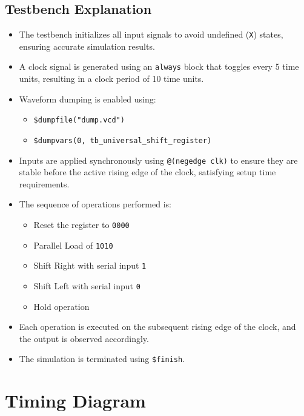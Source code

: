 \documentclass[12pt]{article}
\begin{document}
\subsection{Testbench Explanation}

\begin{itemize}
    \item The testbench initializes all input signals to avoid undefined (\texttt{X}) states, ensuring accurate simulation results.
    
    \item A clock signal is generated using an \texttt{always} block that toggles every 5 time units, resulting in a clock period of 10 time units.
    
    \item Waveform dumping is enabled using:
    \begin{itemize}
        \item \texttt{\$dumpfile("dump.vcd")}
        \item \texttt{\$dumpvars(0, tb\_universal\_shift\_register)}
    \end{itemize}
    
    \item Inputs are applied synchronously using \texttt{@(negedge clk)} to ensure they are stable before the active rising edge of the clock, satisfying setup time requirements.
    
    \item The sequence of operations performed is:
    \begin{itemize}
        \item Reset the register to \texttt{0000}
        \item Parallel Load of \texttt{1010}
        \item Shift Right with serial input \texttt{1}
        \item Shift Left with serial input \texttt{0}
        \item Hold operation
    \end{itemize}
    
    \item Each operation is executed on the subsequent rising edge of the clock, and the output is observed accordingly.
    
    \item The simulation is terminated using \texttt{\$finish}.
\end{itemize}

\section{Timing Diagram}
\end{document}
